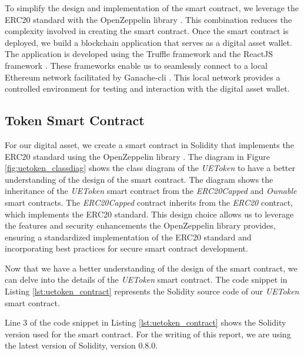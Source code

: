 To simplify the design and implementation of the smart contract, we leverage the ERC20 standard \cite{eth_erc20} with
the OpenZeppelin library \cite{openzeppelin_erc20}. This combination reduces the complexity involved in creating the smart contract. Once the smart contract is deployed, we build a blockchain application that serves as a digital asset wallet.
The application is developed using the Truffle framework \cite{truffle} and the ReactJS framework \cite{react}. These frameworks enable
us to seamlessly connect to a local Ethereum network facilitated by Ganache-cli \cite{trufflesuite_ganachecli}. This local network
provides a controlled environment for testing and interaction with the digital asset wallet.




\subsection{Token Smart Contract}

For our digital asset, we create a smart contract in Solidity \cite{ethereum_solidity_doc} that implements
the ERC20 standard \cite{eth_erc20} using the OpenZeppelin library \cite{openzeppelin_erc20}.
The diagram in Figure \ref{fig:uetoken_classdiag} shows the class diagram of the \textit{UEToken} to have a better understanding of the design
of the smart contract. The diagram shows the inheritance of the \textit{UEToken} smart contract from the \textit{ERC20Capped} and \textit{Ownable}
smart contracts. The \textit{ERC20Capped} contract inherits from the \textit{ERC20} contract, which implements the ERC20 standard. This design choice allows us to leverage the features and security enhancements the OpenZeppelin library provides, ensuring a standardized implementation of the ERC20 standard and incorporating best practices for
secure smart contract development.





Now that we have a better understanding of the design of the smart contract, we can delve into the details of the \textit{UEToken} smart contract.
The code snippet in Listing \ref{lst:uetoken_contract} represents the Solidity source code of our \textit{UEToken} smart contract.





Line 3 of the code snippet in Listing \ref{lst:uetoken_contract} shows the Solidity version used for the smart contract. For the writing of this report,
we are using the latest version of Solidity, version 0.8.0.


